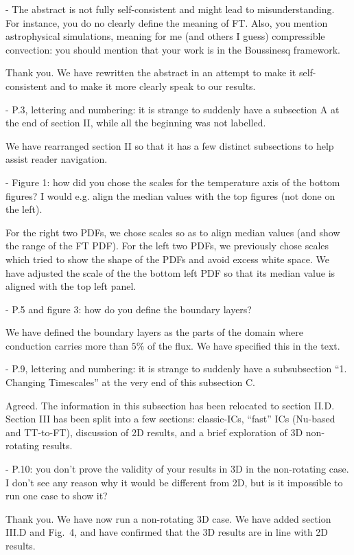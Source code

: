 \documentclass[aps, 11pt, singlecolumn]{revtex4-1} %
\begin{document}
\begin{singlespace}
\begin{myquotation}
-       The abstract is not fully self-consistent and might lead to misunderstanding.
For instance, you do no clearly define the meaning of FT. 
Also, you mention astrophysical simulations, meaning for me (and others I guess) compressible convection: you should mention that your work is in the Boussinesq framework.
\end{myquotation}
Thank you.
We have rewritten the abstract in an attempt to make it self-consistent and to make it more clearly speak to our results.
\begin{myquotation}
-       P.3, lettering and numbering: it is strange to suddenly have a subsection A at the end of section II, while all the beginning was not labelled.
\end{myquotation}
We have rearranged section II so that it has a few distinct subsections to help assist reader navigation.
\begin{myquotation}
-       Figure 1: how did you chose the scales for the temperature axis of the bottom figures? 
I would e.g. align the median values with the top figures (not done on the left).
\end{myquotation}
For the right two PDFs, we chose scales so as to align median values (and show the range of the FT PDF).
For the left two PDFs, we previously chose scales which tried to show the shape of the PDFs and avoid excess white space.
We have adjusted the scale of the the bottom left PDF so that its median value is aligned with the top left panel.
\begin{myquotation}
-       P.5 and figure 3: how do you define the boundary layers?
\end{myquotation}
We have defined the boundary layers as the parts of the domain where conduction carries more than $5\%$ of the flux.
We have specified this in the text.
\begin{myquotation}
-       P.9, lettering and numbering: it is strange to suddenly have a subsubsection “1. Changing Timescales” at the very end of this subsection C.
\end{myquotation}
Agreed.
The information in this subsection has been relocated to section II.D.
Section III has been split into a few sections: classic-ICs, ``fast'' ICs (Nu-based and TT-to-FT), discussion of 2D results, and a brief exploration of 3D non-rotating results.

\begin{myquotation}
-       P.10: you don’t prove the validity of your results in 3D in the non-rotating case. 
I don’t see any reason why it would be different from 2D, but is it impossible to run one case to show it?
\end{myquotation}
Thank you.
We have now run a non-rotating 3D case.
We have added section III.D and Fig.~4, and have confirmed that the 3D results are in line with 2D results.


\end{singlespace}
\end{document}
